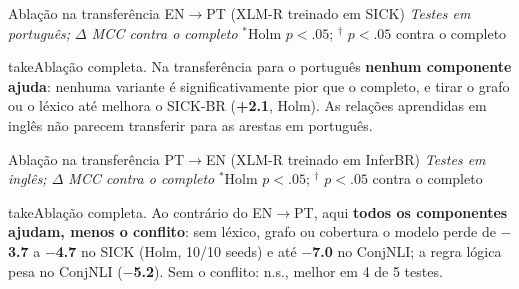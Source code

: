 \documentclass[aspectratio=169,10pt]{beamer}
\newcommand{\up}[1]{\textcolor{logic}{\textbf{#1}}}
\newcommand{\down}[1]{\textcolor{relneg}{\textbf{#1}}}
\newcommand{\take}[1]{\vspace{4pt}\begin{beamercolorbox}[sep=5pt,rounded=true]{take}\small #1\end{beamercolorbox}}
\newcommand{\tbl}[3][1]{{\setlength{\textwidth}{#2}\resizebox{#1\linewidth}{!}{}}}
\begin{document}
\begin{frame}{Ablação na transferência EN$\to$PT (XLM-R treinado em SICK)}
\textit{\small Testes em português; $\Delta$ MCC contra o \model{} completo} \hfill {\scriptsize $^*$Holm $p<.05$; $^\dagger$ $p<.05$ contra o completo}\\[3pt]
\tbl[0.85]{12cm}{pres_ablation_xl_en_to_pt}
\take{Ablação completa. Na transferência para o português \textbf{nenhum componente ajuda}: nenhuma variante é significativamente pior que o \model{} completo, e tirar o grafo ou o léxico até melhora o SICK-BR (\up{+2.1}, Holm). As relações aprendidas em inglês não parecem transferir para as arestas em português.}
\end{frame}

\begin{frame}{Ablação na transferência PT$\to$EN (XLM-R treinado em InferBR)}
\textit{\small Testes em inglês; $\Delta$ MCC contra o \model{} completo} \hfill {\scriptsize $^*$Holm $p<.05$; $^\dagger$ $p<.05$ contra o completo}\\[3pt]
\tbl[0.85]{12cm}{pres_ablation_xl_pt_to_en}
\take{Ablação completa. Ao contrário do EN$\to$PT, aqui \textbf{todos os componentes ajudam, menos o conflito}: sem léxico, grafo ou cobertura o modelo perde de \down{$-$3.7} a \down{$-$4.7} no SICK (Holm, 10/10 seeds) e até \down{$-$7.0} no ConjNLI; a regra lógica pesa no ConjNLI (\down{$-$5.2}). Sem o conflito: n.s., melhor em 4 de 5 testes.}
\end{frame}
\end{document}
